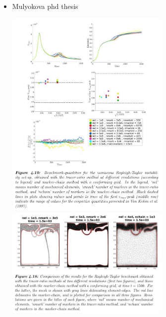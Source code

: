 \begin{itemize}
\item Mulyokova phd thesis \cite{mulyukova} 

\begin{center}
\includegraphics[width=8cm]{images/benchmark_vaks97/mulyukova1}
\includegraphics[width=8cm]{images/benchmark_vaks97/mulyukova2}
\end{center}


\end{itemize}





